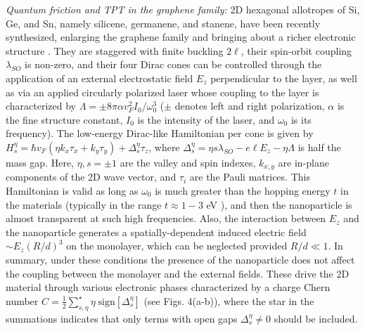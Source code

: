 \documentclass[10pt,aps,prl,superscriptaddress,showpacs,twocolumn]{revtex4-1}
\begin{document}
{\it Quantum friction and TPT in the graphene family:} 
2D hexagonal allotropes of Si, Ge, and Sn, namely silicene, germanene, and stanene, 
have been recently synthesized, enlarging the graphene family and bringing about a richer electronic structure \cite{Castellanos2016,Mannix2017,Molle2017}. 
They are staggered with finite buckling $2 \ell$, 
their spin-orbit coupling $\lambda_{SO}$ is non-zero, and their four Dirac cones can be controlled through the application of an external electrostatic field $E_z$ perpendicular to the layer, as well as
via an applied circularly polarized laser whose coupling to the layer is characterized by $\Lambda=\pm 8 \pi \alpha v_F^2 I_0/\omega_0^3$ ($\pm$ denotes left and right polarization, $\alpha$ is the fine structure constant, $I_0$ is the intensity of the laser, and $\omega_0$ is its frequency). 
The low-energy Dirac-like Hamiltonian per cone is given by $H_s^{\eta}=\hbar v_F (\eta k_x \tau_x + k_y \tau_y) +  \Delta_s^{\eta} \tau_z$,  where 
$\Delta_s^{\eta} = \eta s \lambda_{SO} - e \ell E_z - \eta \Lambda$ is half the mass gap. Here, $\eta,s= \pm 1$ are the valley and spin indexes, $k_{x,y}$ are in-plane components of the 2D wave vector, and $\tau_i$ are the Pauli matrices. This Hamiltonian is valid as long as $\omega_0$ is much greater than the hopping energy $t$ in the materials (typically in the range  $t \approx 1-3$ eV \cite{Ezawa2013}), and then the nanoparticle is almost transparent at such high frequencies. Also, the interaction between $E_z$ and the nanoparticle generates a spatially-dependent induced electric field $\sim E_z (R/d)^3$ on the monolayer, which can be neglected provided $R/d \ll1$. In summary, under these conditions the presence of the nanoparticle does not affect the coupling between the  monolayer and the external fields. These drive the 2D material through various electronic phases characterized by a charge Chern number $C = \frac{1}{2}\sum^{\star}_{s,\eta}\eta \; \text{sign}[\Delta_{s}^{\eta}]$ (see Figs. 4(a-b)),  where the star in the summations indicates that only terms with open gaps $\Delta^{\eta}_s \neq 0$ should be included. 
\end{document}
